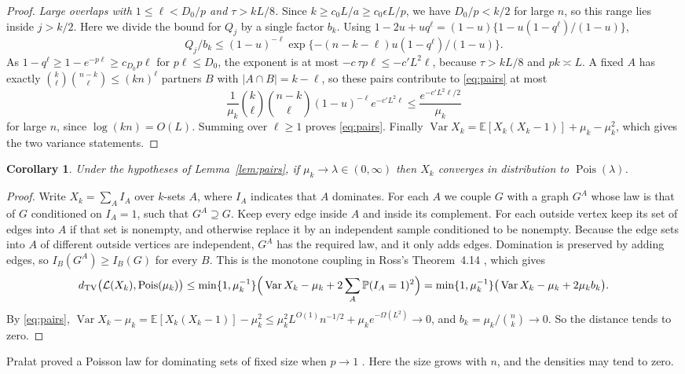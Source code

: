 \documentclass[11pt]{article}
\newtheorem{corollary}[theorem]{Corollary}
\theoremstyle{remark}
\newcommand{\E}{\mathbb E}
\newcommand{\PP}{\mathbb P}
\newcommand{\Var}{\operatorname{Var}}
\newcommand{\Pois}{\operatorname{Pois}}
\begin{document}
\begin{proof}
\emph{Large overlaps with $1\le\ell<D_0/p$ and $\tau>kL/8$.} Since $k\ge c_0L/a\ge c_0\epsilon L/p$, we have $D_0/p<k/2$ for large $n$, so this range lies inside $j>k/2$. Here we divide the bound for $Q_j$ by a single factor $b_k$. Using $1-2u+uq^\ell=(1-u)\{1-u(1-q^\ell)/(1-u)\}$,
\[
 Q_j/b_k\le (1-u)^{-\ell}\exp\{-(n-k-\ell)u(1-q^\ell)/(1-u)\}.
\]
As $1-q^\ell\ge1-e^{-p\ell}\ge c_{D_0}p\ell$ for $p\ell\le D_0$, the exponent is at most $-c\,\tau p\ell\le -c'L^2\ell$, because $\tau>kL/8$ and $pk\asymp L$. A fixed $A$ has exactly $\binom k\ell\binom{n-k}\ell\le(kn)^\ell$ partners $B$ with $|A\cap B|=k-\ell$, so these pairs contribute to \eqref{eq:pairs} at most
\[
 \frac1{\mu_k}\binom k\ell\binom{n-k}\ell(1-u)^{-\ell}e^{-c'L^2\ell}
 \le\frac{e^{-c'L^2\ell/2}}{\mu_k}
\]
for large $n$, since $\log(kn)=O(L)$. Summing over $\ell\ge1$ proves \eqref{eq:pairs}. Finally $\Var X_k=\E[X_k(X_k-1)]+\mu_k-\mu_k^2$, which gives the two variance statements.
\end{proof}

\begin{corollary}\label{cor:poisson}
Under the hypotheses of Lemma~\ref{lem:pairs}, if $\mu_k\to\lambda\in(0,\infty)$ then $X_k$ converges in distribution to $\Pois(\lambda)$.
\end{corollary}
\begin{proof}
Write $X_k=\sum_AI_A$ over $k$-sets $A$, where $I_A$ indicates that $A$ dominates. For each $A$ we couple $G$ with a graph $G^{A}$ whose law is that of $G$ conditioned on $I_A=1$, such that $G^{A}\supseteq G$. Keep every edge inside $A$ and inside its complement. For each outside vertex keep its set of edges into $A$ if that set is nonempty, and otherwise replace it by an independent sample conditioned to be nonempty. Because the edge sets into $A$ of different outside vertices are independent, $G^{A}$ has the required law, and it only adds edges. Domination is preserved by adding edges, so $I_B(G^{A})\ge I_B(G)$ for every $B$. This is the monotone coupling in Ross's Theorem~4.14 \cite{Ross}, which gives
\[
 d_{\rm TV}\big(\mathcal L(X_k),\Pois(\mu_k)\big)
 \le \min\{1,\mu_k^{-1}\}\Big(\Var X_k-\mu_k+2\sum_A\PP(I_A=1)^2\Big)
 =\min\{1,\mu_k^{-1}\}\big(\Var X_k-\mu_k+2\mu_kb_k\big).
\]
By \eqref{eq:pairs}, $\Var X_k-\mu_k=\E[X_k(X_k-1)]-\mu_k^2\le \mu_k^2L^{O(1)}n^{-1/2}+\mu_ke^{-\Omega(L^2)}\to0$, and $b_k=\mu_k/\binom nk\to0$. So the distance tends to zero.
\end{proof}
Pra{\l}at proved a Poisson law for dominating sets of fixed size when $p\to1$ \cite[Theorem~2.1]{Pralat}. Here the size grows with $n$, and the densities may tend to zero.
\end{document}
